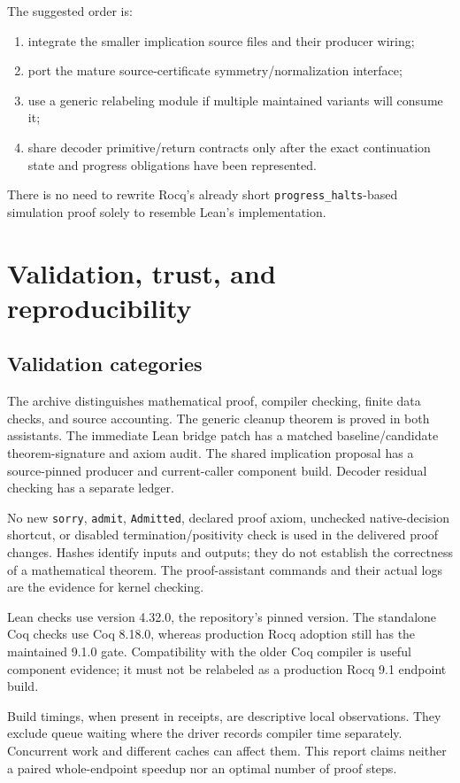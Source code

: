 \documentclass[11pt,letterpaper]{article}
\newcommand{\code}[1]{\texttt{#1}}
\begin{document}
The suggested order is:
\begin{enumerate}
\item integrate the smaller implication source files and their producer wiring;
\item port the mature source-certificate symmetry/normalization interface;
\item use a generic relabeling module if multiple maintained variants will consume it;
\item share decoder primitive/return contracts only after the exact continuation
      state and progress obligations have been represented.
\end{enumerate}
There is no need to rewrite Rocq's already short \code{progress\_halts}-based
simulation proof solely to resemble Lean's implementation.

\section{Validation, trust, and reproducibility}

\subsection{Validation categories}

The archive distinguishes mathematical proof, compiler checking, finite data checks,
and source accounting. The generic cleanup theorem is proved in both assistants.
The immediate Lean bridge patch has a matched baseline/candidate theorem-signature
and axiom audit. The shared implication proposal has a source-pinned producer and
current-caller component build. Decoder residual checking has a separate ledger.

No new \code{sorry}, \code{admit}, \code{Admitted}, declared proof axiom,
unchecked native-decision shortcut, or disabled termination/positivity check is used
in the delivered proof changes. Hashes identify inputs and outputs; they do not
establish the correctness of a mathematical theorem. The proof-assistant commands
and their actual logs are the evidence for kernel checking.

Lean checks use version 4.32.0, the repository's pinned version. The standalone Coq
checks use Coq 8.18.0, whereas production Rocq adoption still has the maintained
9.1.0 gate. Compatibility with the older Coq compiler is useful component evidence;
it must not be relabeled as a production Rocq 9.1 endpoint build.

Build timings, when present in receipts, are descriptive local observations. They
exclude queue waiting where the driver records compiler time separately. Concurrent
work and different caches can affect them. This report claims neither a paired
whole-endpoint speedup nor an optimal number of proof steps.
\end{document}

